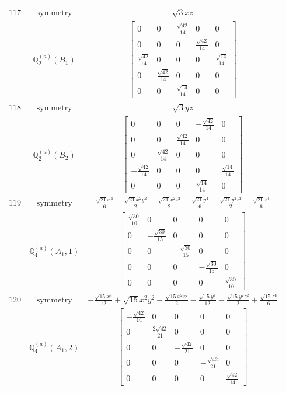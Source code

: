 \documentclass[fleqn,8pt,landscape]{jsarticle}
\begin{document}
\begin{longtable}{ccc}
$ 117 $ & $ \text{symmetry} $ & $ \sqrt{3} x z $ \\
$  $ & $ \mathbb{Q}_{2}^{(a)}(B_{1}) $ & $ \begin{bmatrix} 0 & 0 & \frac{\sqrt{42}}{14} & 0 & 0 \\ 0 & 0 & 0 & \frac{\sqrt{42}}{14} & 0 \\ \frac{\sqrt{42}}{14} & 0 & 0 & 0 & \frac{\sqrt{14}}{14} \\ 0 & \frac{\sqrt{42}}{14} & 0 & 0 & 0 \\ 0 & 0 & \frac{\sqrt{14}}{14} & 0 & 0 \end{bmatrix} $ \\ \hline
$ 118 $ & $ \text{symmetry} $ & $ \sqrt{3} y z $ \\
$  $ & $ \mathbb{Q}_{2}^{(a)}(B_{2}) $ & $ \begin{bmatrix} 0 & 0 & 0 & - \frac{\sqrt{42}}{14} & 0 \\ 0 & 0 & \frac{\sqrt{42}}{14} & 0 & 0 \\ 0 & \frac{\sqrt{42}}{14} & 0 & 0 & 0 \\ - \frac{\sqrt{42}}{14} & 0 & 0 & 0 & \frac{\sqrt{14}}{14} \\ 0 & 0 & 0 & \frac{\sqrt{14}}{14} & 0 \end{bmatrix} $ \\ \hline
$ 119 $ & $ \text{symmetry} $ & $ \frac{\sqrt{21} x^{4}}{6} - \frac{\sqrt{21} x^{2} y^{2}}{2} - \frac{\sqrt{21} x^{2} z^{2}}{2} + \frac{\sqrt{21} y^{4}}{6} - \frac{\sqrt{21} y^{2} z^{2}}{2} + \frac{\sqrt{21} z^{4}}{6} $ \\
$  $ & $ \mathbb{Q}_{4}^{(a)}(A_{1},1) $ & $ \begin{bmatrix} \frac{\sqrt{30}}{10} & 0 & 0 & 0 & 0 \\ 0 & - \frac{\sqrt{30}}{15} & 0 & 0 & 0 \\ 0 & 0 & - \frac{\sqrt{30}}{15} & 0 & 0 \\ 0 & 0 & 0 & - \frac{\sqrt{30}}{15} & 0 \\ 0 & 0 & 0 & 0 & \frac{\sqrt{30}}{10} \end{bmatrix} $ \\ \hline
$ 120 $ & $ \text{symmetry} $ & $ - \frac{\sqrt{15} x^{4}}{12} + \sqrt{15} x^{2} y^{2} - \frac{\sqrt{15} x^{2} z^{2}}{2} - \frac{\sqrt{15} y^{4}}{12} - \frac{\sqrt{15} y^{2} z^{2}}{2} + \frac{\sqrt{15} z^{4}}{6} $ \\
$  $ & $ \mathbb{Q}_{4}^{(a)}(A_{1},2) $ & $ \begin{bmatrix} - \frac{\sqrt{42}}{14} & 0 & 0 & 0 & 0 \\ 0 & \frac{2 \sqrt{42}}{21} & 0 & 0 & 0 \\ 0 & 0 & - \frac{\sqrt{42}}{21} & 0 & 0 \\ 0 & 0 & 0 & - \frac{\sqrt{42}}{21} & 0 \\ 0 & 0 & 0 & 0 & \frac{\sqrt{42}}{14} \end{bmatrix} $ \\ \hline

\end{longtable}
\end{document}

